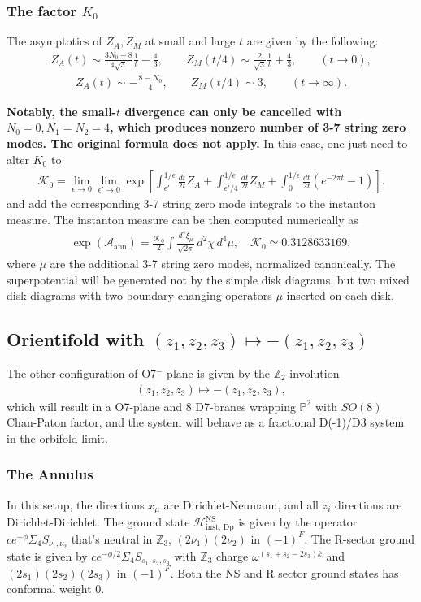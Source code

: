 \documentclass[12pt]{article}
\newcommand{\ie}{\begin{equation}\begin{aligned}}
\newcommand{\fe}{\end{aligned}\end{equation}}
\begin{document}
\subsubsection*{The factor $K_0$}

The asymptotics of $Z_A, Z_M$ at small and large $t$ are given by the following:
\ie
Z_A(t)\sim \frac{3N_0-8}{4\sqrt3}\frac1t-\frac43,\qquad
Z_M(t/4)\sim \frac{2}{\sqrt3}\frac1t+\frac43,
\qquad (t\to 0),
\fe
\ie
Z_A(t)\sim -\frac{8-N_0}{4},\qquad
Z_M(t/4)\sim 3,\qquad (t\to\infty).
\fe

\textbf{Notably, the small-$t$ divergence can only be cancelled with $N_0=0,N_1=N_2=4$, which produces nonzero number of 3-7 string zero modes. The original formula does not apply.} In this case, one just need to alter $K_0$ to
\ie 
\mathcal{K}_0 = \lim_{\epsilon \rightarrow 0}\lim_{\epsilon' \rightarrow 0} \exp\left[\int_{\epsilon'}^{1/\epsilon} \frac{dt}{2t}Z_A+\int_{\epsilon'/4}^{1/\epsilon} \frac{dt}{2t}Z_M+\int_0^{1/\epsilon}\frac{dt}{2t}(e^{-2\pi t}-1)\right].
\fe
and add the corresponding 3-7 string zero mode integrals to the instanton measure. The instanton measure can be then computed numerically as
\ie
\exp(\mathcal{A}_\text{ann})=\frac{\mathcal{K}_0}{2}\int \frac{d^4\xi_\mu}{\sqrt{2\pi}} \,d^2\chi\, d^4\mu,\quad \mathcal{K}_0\simeq 0.3128633169,
\fe
where $\mu$ are the additional 3-7 string zero modes, normalized canonically. The superpotential will be generated not by the simple disk diagrams, but two mixed disk diagrams with two boundary changing operators $\mu$ inserted on each disk.

\subsection{Orientifold with $(z_1,z_2,z_3)\mapsto -(z_1,z_2,z_3)$}

The other configuration of O7${}^-$-plane is given by the $\mathbb{Z}_2$-involution
\ie
(z_1,z_2,z_3)\mapsto -(z_1,z_2,z_3),
\fe
which will result in a O7-plane and 8 D7-branes wrapping $\mathbb{P}^2$ with $SO(8)$ Chan-Paton factor, and the system will behave as a fractional D(-1)/D3 system in the orbifold limit.

\subsubsection*{The Annulus}

In this setup, the directions $x_\mu$ are Dirichlet-Neumann, and all $z_i$ directions are Dirichlet-Dirichlet. The ground state $\mathcal{H}^\text{NS}_{\text{inst, Dp}}$ is given by the operator $ce^{-\phi}\Sigma_4 S_{\nu_1, \nu_2}$ that's neutral in $\mathbb{Z}_3$, $(2\nu_1)(2\nu_2)$ in $(-1)^F$. The R-sector ground state is given by $ce^{-\phi/2}\Sigma_4 S_{s_1,s_2,s_3}$ with $\mathbb{Z}_3$ charge $\omega^{(s_1+s_2-2s_3)k}$ and $(2s_1)(2s_2)(2s_3)$ in $(-1)^F$. Both the NS and R sector ground states has conformal weight 0.
\end{document}
